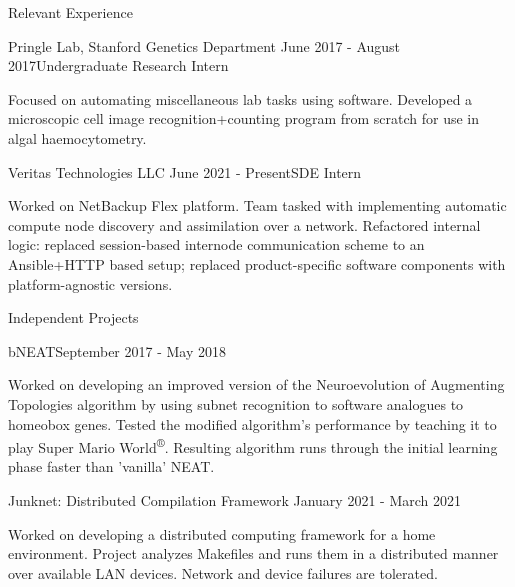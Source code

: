 \documentclass{resume} %
\begin{document}
\begin{resumeSection}{Relevant Experience}

\begin{resumeSubsection}{Pringle Lab, Stanford Genetics Department}
	{June 2017 - August 2017}{Undergraduate Research Intern}{}
\item Focused on automating miscellaneous lab tasks using software. Developed a
	microscopic cell image recognition+counting program from scratch for
	use in algal haemocytometry.
\end{resumeSubsection}
\begin{resumeSubsection}{Veritas Technologies LLC}
	{June 2021 - Present}{SDE Intern}{}
\item Worked on NetBackup Flex platform. Team tasked with implementing
	automatic compute node discovery and assimilation over a network.
	Refactored internal logic: replaced session-based internode
	communication scheme to an Ansible+HTTP based setup; replaced
	product-specific software components with platform-agnostic versions. 
	
\end{resumeSubsection}

\end{resumeSection}


\begin{resumeSection}{Independent Projects} \itemsep -2pt

\begin{resumeSubsection}{bNEAT}{September 2017 - May 2018}{}{}
\item Worked on developing an improved version of the Neuroevolution of
	Augmenting Topologies algorithm by using subnet recognition to
	software analogues to homeobox genes. Tested the modified
	algorithm's performance by teaching it to play Super Mario
	World\textsuperscript{®}. Resulting algorithm runs through the initial
	learning phase faster than 'vanilla' NEAT.
\end{resumeSubsection}
\begin{resumeSubsection}{Junknet: Distributed Compilation Framework}
	{January 2021 - March 2021}{}{}
\item Worked on developing a distributed computing framework for a home
	environment. Project analyzes Makefiles and runs them in a distributed
	manner over available LAN devices. Network and device failures are
	tolerated.
\end{resumeSubsection}

\end{resumeSection}
\end{document}
